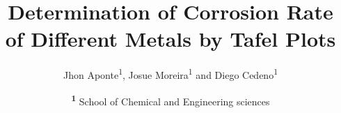 \documentclass[twocolumn]{NobArticle}
\title{Determination of Corrosion Rate of Different Metals by Tafel Plots}
\author{
    Jhon Aponte\textsuperscript{1}, 
    Josue Moreira\textsuperscript{1} 
    and Diego Cedeno\textsuperscript{1}
}
\date{
    \textsuperscript{\textbf{1}}
    School of Chemical and Engineering sciences 
}
\begin{document}
\small
\maketitle









\printbibliography
\end{document}
